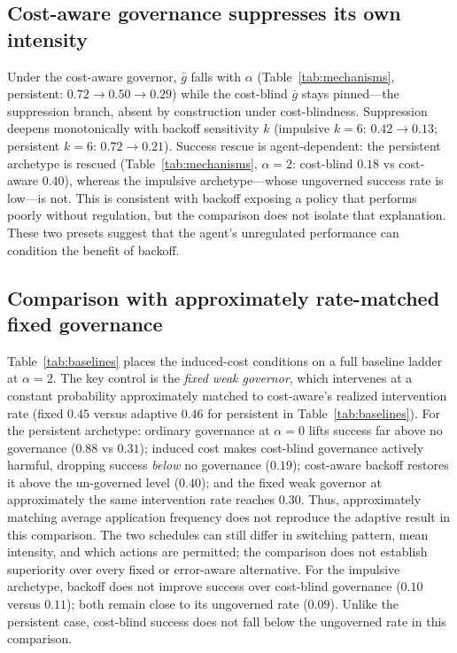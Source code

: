 \documentclass[11pt]{article}
\begin{document}
\subsection{Cost-aware governance suppresses its own intensity}
\label{sec:suppression}

Under the cost-aware governor, $\bar g$ falls with $\alpha$ (Table~\ref{tab:mechanisms},
persistent: $0.72\to0.50\to0.29$) while the cost-blind $\bar g$ stays pinned---the
suppression branch, absent by construction under cost-blindness. Suppression
deepens monotonically with backoff sensitivity $k$ (impulsive $k{=}6$:
$0.42\to0.13$; persistent $k{=}6$: $0.72\to0.21$). Success rescue is
agent-dependent: the persistent archetype is rescued (Table~\ref{tab:mechanisms},
$\alpha{=}2$: cost-blind $0.18$ vs cost-aware $0.40$), whereas the impulsive
archetype---whose ungoverned success rate is low---is not. This is consistent
with backoff exposing a policy that performs poorly without regulation, but
the comparison does not isolate that explanation. These two presets suggest
that the agent's unregulated performance can condition the benefit of backoff.

\subsection{Comparison with approximately rate-matched fixed governance}
\label{sec:baselines}

Table~\ref{tab:baselines} places the induced-cost conditions on a full baseline
ladder at $\alpha=2$. The key control is the \emph{fixed weak governor}, which
intervenes at a constant probability approximately matched to cost-aware's realized
intervention rate (fixed $0.45$ versus adaptive $0.46$ for persistent in
Table~\ref{tab:baselines}). For the persistent archetype:
ordinary governance at $\alpha=0$ lifts success far above no governance
($0.88$ vs $0.31$); induced cost makes cost-blind governance actively harmful,
dropping success \emph{below} no governance ($0.19$); cost-aware backoff
restores it above the un-governed level ($0.40$); and the fixed
weak governor at approximately the same intervention rate reaches $0.30$.
Thus, approximately matching average application frequency does not reproduce the adaptive
result in this comparison. The two schedules can still differ in switching
pattern, mean intensity, and which actions are permitted; the comparison does
not establish superiority over every fixed or error-aware alternative. For
the impulsive archetype, backoff does not improve success over cost-blind
governance ($0.10$ versus $0.11$); both remain close to its ungoverned rate
($0.09$). Unlike the persistent case, cost-blind success does not fall below
the ungoverned rate in this comparison.
\end{document}
